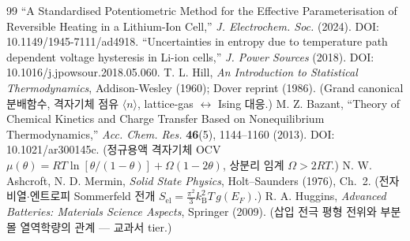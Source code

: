 \documentclass[11pt,a4paper]{article}
\newcommand{\elec}{\mathrm{el}}
\newcommand{\kB}{k_{\mathrm{B}}}
\newcommand{\avg}[1]{\langle #1\rangle}
\begin{document}
\begin{thebibliography}{99}
 ``A Standardised Potentiometric Method for the Effective Parameterisation of Reversible Heating in a Lithium-Ion Cell,'' \emph{J. Electrochem. Soc.} (2024). DOI: 10.1149/1945-7111/ad4918.
 ``Uncertainties in entropy due to temperature path dependent voltage hysteresis in Li-ion cells,'' \emph{J. Power Sources} (2018). DOI: 10.1016/j.jpowsour.2018.05.060.
 T. L. Hill, \emph{An Introduction to Statistical Thermodynamics}, Addison-Wesley (1960); Dover reprint (1986). (Grand canonical 분배함수, 격자기체 점유 $\avg{n}$, lattice-gas $\leftrightarrow$ Ising 대응.)
 M. Z. Bazant, ``Theory of Chemical Kinetics and Charge Transfer Based on Nonequilibrium Thermodynamics,'' \emph{Acc. Chem. Res.} \textbf{46}(5), 1144--1160 (2013). DOI: 10.1021/ar300145c. (정규용액 격자기체 OCV $\mu(\theta)=RT\ln[\theta/(1-\theta)]+\Omega(1-2\theta)$, 상분리 임계 $\Omega>2RT$.)
 N. W. Ashcroft, N. D. Mermin, \emph{Solid State Physics}, Holt--Saunders (1976), Ch.~2. (전자 비열$\cdot$엔트로피 Sommerfeld 전개 $S_\elec=\tfrac{\pi^2}{3}\kB^2 T\,g(E_F)$.)
 R. A. Huggins, \emph{Advanced Batteries: Materials Science Aspects}, Springer (2009). (삽입 전극 평형 전위와 부분몰 열역학량의 관계 — 교과서 tier.)
\end{thebibliography}
\end{document}
